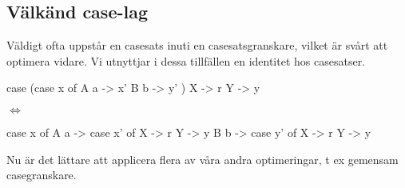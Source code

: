 \documentclass[../Optimise]{subfiles}
\begin{document}
\subsection{Välkänd case-lag}

Väldigt ofta uppstår en casesats inuti en casesatsgranskare, 
vilket är svårt att optimera vidare.
Vi utnyttjar i dessa tillfällen en identitet hos casesatser. 
\begin{codeEx}
 case (case x of
         A a -> x'
         B b -> y'
      )
   X -> r
   Y -> y

\end{codeEx}
 
$\Leftrightarrow$

\begin{codeEx}
 case x of
     A a -> case x' of
              X -> r
              Y -> y
     B b -> case y' of
              X -> r
              Y -> y
\end{codeEx}

Nu är det lättare att applicera flera av våra andra optimeringar, 
t ex gemensam casegranskare. 
\end{document}
